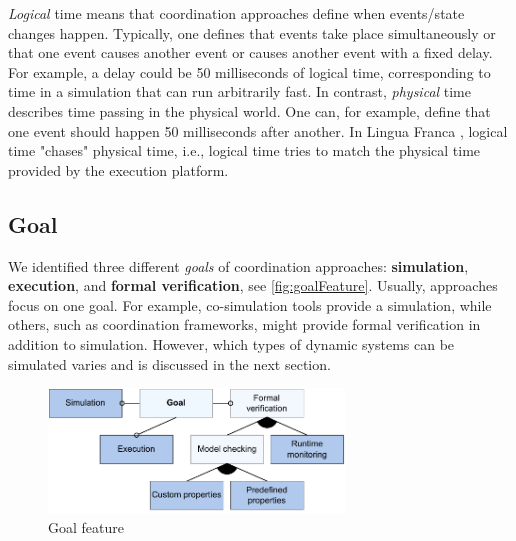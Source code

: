 \documentclass[runningheads]{llncs}
\begin{document}
\textit{Logical} time means that coordination approaches define when events/state changes happen.
Typically, one defines that events take place simultaneously or that one event causes another event or causes another event with a fixed delay.
For example, a delay could be 50 milliseconds of logical time, corresponding to time in a simulation that can run arbitrarily fast. 
In contrast, \textit{physical} time describes time passing in the physical world.
One can, for example, define that one event should happen 50 milliseconds after another.
In Lingua Franca \cite{lohstrohReactorsDeterministicModel2020}, logical time "chases" physical time, i.e., logical time tries to match the physical time provided by the execution platform.


\subsection{Goal} %
We identified three different \textit{goals} of coordination approaches: \textbf{simulation}, \textbf{execution}, and \textbf{formal verification}, see \autoref{fig:goalFeature}.
Usually, approaches focus on one goal.
For example, co-simulation tools provide a simulation, while others, such as coordination frameworks, might provide formal verification in addition to simulation.
However, which types of dynamic systems can be simulated varies and is discussed in the next section.

\begin{figure}[ht]
	\centering
	\includegraphics[width=0.7\textwidth]{images/goal_feature}
	\caption{Goal feature}
	\label{fig:goalFeature}
\end{figure}
\end{document}
